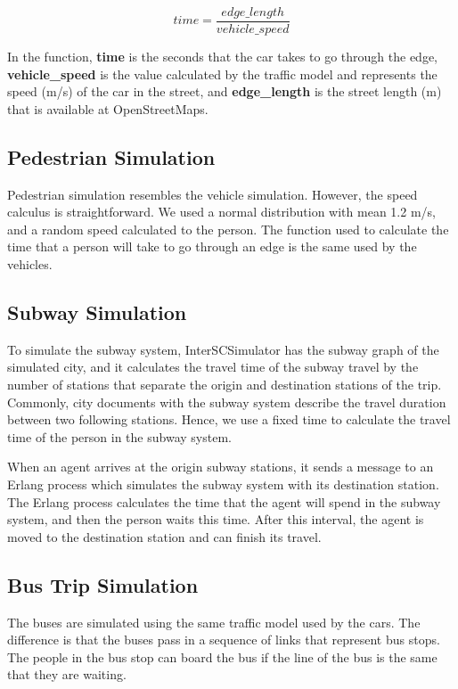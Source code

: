 \[
time = \frac{edge\_length}{vehicle\_speed}
\]

In the function, \textbf{time} is the seconds that the car takes to go through the edge, \textbf{vehicle\_speed} is the value calculated by the traffic model and represents the speed (m/s) of the car in the street, and  \textbf{edge\_length} is the street length (m) that is available at OpenStreetMaps.


\subsection{Pedestrian Simulation}

Pedestrian simulation resembles the vehicle simulation. However, the speed calculus is straightforward. We used a normal distribution with mean 1.2 m/s, and a random speed calculated to the person. The function used to calculate the time that a person will take to go through an edge is the same used by the vehicles.

\subsection{Subway Simulation}

To simulate the subway system, InterSCSimulator has the subway graph of the simulated city, and it calculates the travel time of the subway travel by the number of stations that separate the origin and destination stations of the trip. Commonly, city documents with the subway system describe the travel duration between two following stations. Hence, we use a fixed time to calculate the travel time of the person in the subway system.

When an agent arrives at the origin subway stations, it sends a message to an Erlang process which simulates the subway system with its destination station. The Erlang process calculates the time that the agent will spend in the subway system, and then the person waits this time. After this interval, the agent is moved to the destination station and can finish its travel.

\subsection{Bus Trip Simulation}

The buses are simulated using the same traffic model used by the cars. The difference is that the buses pass in a sequence of links that represent bus stops. The people in the bus stop can board the bus if the line of the bus is the same that they are waiting.


